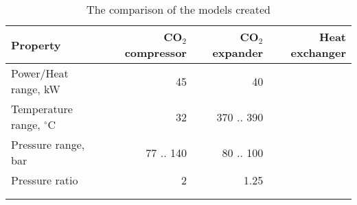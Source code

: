 \begin{table}
\label{tab:DiscussionComparison}
\caption{The comparison of the models created}
\begin{center}
\begin{tabulary}{0.9\textwidth}{LRRR}
\toprule
Property    	                &	CO$_2$ compressor   & CO$_2$	expander    & Heat exchanger    \\
\midrule
Power/Heat range, kW            &       45              &       40              &                   \\
Temperature range, $^\circ$C    &    32                 &      370 .. 390     &                   \\
Pressure range, bar             &   77 .. 140           &     80 .. 100         &                   \\
Pressure ratio                  &   2                   &        1.25           &                   \\
& & & \\
& & & \\
\bottomrule
\end{tabulary}
\end{center}
\end{table}